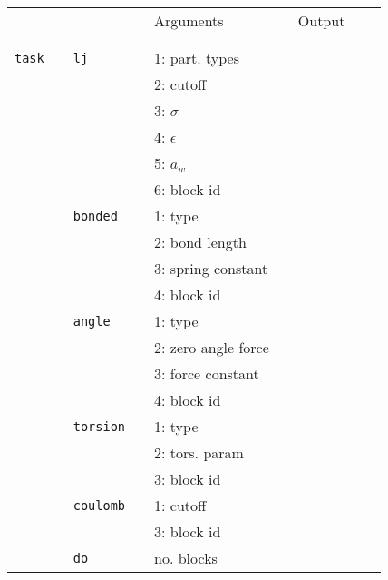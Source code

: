 \documentclass[11pt]{article}
\begin{document}
\clearpage
\begin{center}
  
  \begin{tabular}{cclclclll}
    {\color{red}{\textbf{Action}}} && {\color{blue}{Specifier}} && Arguments && Output \\
                                   && && && \\
    \hline
                                   && && && \\
    \verb!task! && \verb!lj!       && 1: part. types && \\
                                   && && 2: cutoff&& \\
                                   && && 3: $\sigma$ && \\
                                   && && 4: $\epsilon$ && \\
                                   && && 5: $a_w$ && \\
                                   && && 6: block id \\ 
                    && \verb!bonded! && 1: type && \\  
                    &&             && 2: bond length && \\
                                   &&             && 3: spring constant && \\
                                   && && 4: block id \\
                    && \verb!angle!&& 1: type && \\  
                    &&             && 2: zero angle force && \\
                                   &&             && 3: force constant && \\
                                   && && 4: block id \\
                    && \verb!torsion! && 1: type && \\  
                                   &&             && 2: tors. param && \\
                                   && && 3: block id \\
                   && \verb!coulomb! && 1: cutoff && \\  
                   &&                && 3: block id && \\
                   && \verb!do! && no. blocks && \\
  \end{tabular}

\end{center}
\end{document}
